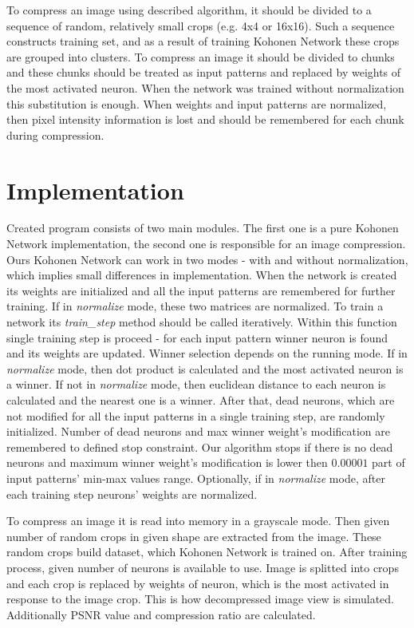 \documentclass{classrep}
\begin{document}
{        To compress an image using described algorithm, it should be divided to a sequence of
        random, relatively small crops (e.g. 4x4 or 16x16). Such a sequence constructs training set,
        and as a result of training Kohonen Network these crops are grouped into clusters.  To
        compress an image it should be divided to chunks and these chunks should be treated as input
        patterns and replaced by weights of the most activated neuron. When the network was trained
        without normalization this substitution is enough. When weights and input
        patterns are normalized, then pixel intensity information is lost and should be
        remembered for each chunk during compression.
    }

    \section{Implementation} \label{implementation} {
        Created program consists of two main modules. The first one is a pure Kohonen Network
        implementation, the second one is responsible for an image compression. Ours Kohonen Network
        can work in two modes - with and without normalization, which implies small differences in
        implementation. When the network is created its weights are initialized and all the input
        patterns are remembered for further training. If in \emph{normalize} mode, these two
        matrices are normalized. To train a network its \emph{train\_step} method should be called
        iteratively. Within this function single training step is proceed - for each input pattern
        winner neuron is found and its weights are updated. Winner selection depends on the running
        mode. If in \emph{normalize} mode, then dot product is calculated and the most activated
        neuron is a winner. If not in \emph{normalize} mode, then euclidean distance to each neuron
        is calculated and the nearest one is a winner. After that, dead neurons, which are not
        modified for all the input patterns in a single training step, are randomly initialized.
        Number of dead neurons and max winner weight's modification are remembered to defined stop
        constraint. Our algorithm stops if there is no dead neurons and maximum winner weight's
        modification is lower then $0.00001$ part of input patterns' min-max values range.
        Optionally, if in \emph{normalize} mode, after each training step neurons' weights are
        normalized.

        To compress an image it is read into memory in a grayscale mode. Then given number of
        random crops in given shape are extracted from the image. These random crops build dataset,
        which Kohonen Network is trained on. After training process, given number of neurons is
        available to use. Image is splitted into crops and each crop is replaced by weights of
        neuron, which is the most activated in response to the image crop. This is how decompressed
        image view is simulated. Additionally PSNR value and compression ratio are calculated.
    }
\end{document}
